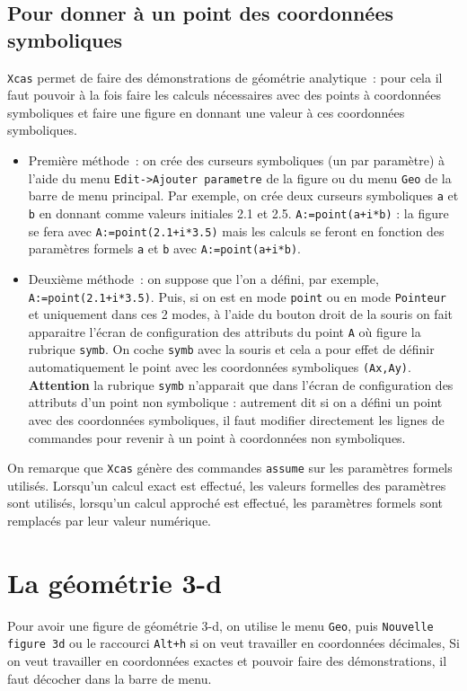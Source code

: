 \documentclass[a4paper,11pt]{article}
\begin{document}
\subsection{Pour donner \`a un point des coordonn\'ees symboliques}
{\tt Xcas} permet de faire des d\'emonstrations de 
g\'eom\'etrie analytique~: 
pour cela il faut pouvoir \`a la fois faire les calculs 
n\'ecessaires avec des points \`a coordonn\'ees symboliques et faire 
une figure en donnant une valeur \`a ces coordonn\'ees symboliques.
\begin{itemize}
\item 
Premi\`ere m\'ethode~: on cr\'ee des curseurs symboliques (un par param\`etre)
\`a l'aide du menu {\tt Edit->Ajouter parametre} de la figure
ou du menu {\tt Geo} de la barre de menu principal.
Par exemple, on cr\'ee deux curseurs symboliques {\tt a} et {\tt b}
en donnant comme valeurs initiales 2.1 et 2.5.
{\tt A:=point(a+i*b)} : 
la figure se fera avec {\tt A:=point(2.1+i*3.5)} mais 
les calculs se feront en fonction des param\`etres formels {\tt a} et {\tt b} 
avec {\tt A:=point(a+i*b)}.
\item Deuxi\`eme m\'ethode~:
on suppose que l'on a d\'efini, par exemple,
{\tt A:=point(2.1+i*3.5)}. Puis, si on est en mode {\tt point} ou en mode 
{\tt Pointeur} et uniquement dans ces 2 modes, \`a l'aide du bouton droit de la
souris on fait apparaitre l'\'ecran de configuration des attributs du point 
{\tt A} o\`u figure la rubrique {\tt symb}. On coche {\tt symb} avec la souris 
et cela a pour effet de d\'efinir automatiquement le point avec les 
coordonn\'ees symboliques {\tt (Ax,Ay)}. \\
{\bf Attention} la rubrique {\tt symb} n'apparait que  dans l'\'ecran de 
configuration des attributs d'un point non symbolique : autrement dit si on a 
d\'efini un point avec des coordonn\'ees symboliques, il faut
modifier directement les lignes de commandes pour revenir \`a
un point \`a coordonn\'ees non symboliques.
\end{itemize}
On remarque que {\tt Xcas} g\'en\`ere des commandes {\tt assume} sur
les param\`etres formels utilis\'es. Lorsqu'un calcul exact est effectu\'e,
les valeurs formelles des param\`etres sont utilis\'es, lorsqu'un calcul
approch\'e est effectu\'e, les param\`etres formels sont remplac\'es
par leur valeur num\'erique.

\section{La g\'eom\'etrie 3-d}
Pour avoir une figure de g\'eom\'etrie 3-d, on utilise le menu 
{\tt Geo}, puis {\tt Nouvelle figure 3d} ou le raccourci {\tt Alt+h} si on 
veut travailler en coordonn\'ees d\'ecimales,
 Si on veut travailler en coordonn\'ees  exactes et 
pouvoir faire des d\'emonstrations, il faut d\'ecocher \framebox{$\sim$} dans 
la barre de menu.
\end{document}
